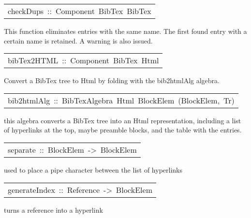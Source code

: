 \begin{haddockdesc}
\item[\begin{tabular}{@{}l}
checkDups\ ::\ Component\ BibTex\ BibTex
\end{tabular}]\haddockbegindoc
This function eliminates entries with the same name. The first found entry with a certain name is retained. 
 A warning is also issued. 
\par

\end{haddockdesc}
\begin{haddockdesc}
\item[\begin{tabular}{@{}l}
bibTex2HTML\ ::\ Component\ BibTex\ Html
\end{tabular}]\haddockbegindoc
Convert a BibTex tree to Html by folding with the bib2htmlAlg algebra.
\par

\end{haddockdesc}
\begin{haddockdesc}
\item[\begin{tabular}{@{}l}
bib2htmlAlg\ ::\ BibTexAlgebra\ Html\ BlockElem\ ({\char 91}BlockElem{\char 93},\ Tr)
\end{tabular}]\haddockbegindoc
this algebra converts a BibTex tree into an Html representation, including
 a list of hyperlinks at the top, maybe preamble blocks, and the table with the
 entries. 
\par

\end{haddockdesc}
\begin{haddockdesc}
\item[\begin{tabular}{@{}l}
separate\ ::\ {\char 91}BlockElem{\char 93}\ ->\ {\char 91}BlockElem{\char 93}
\end{tabular}]\haddockbegindoc
used to place a pipe character between the list of hyperlinks 
\par

\end{haddockdesc}
\begin{haddockdesc}
\item[\begin{tabular}{@{}l}
generateIndex\ ::\ Reference\ ->\ {\char 91}BlockElem{\char 93}
\end{tabular}]\haddockbegindoc
turns a reference into a hyperlink 
\par

\end{haddockdesc}
